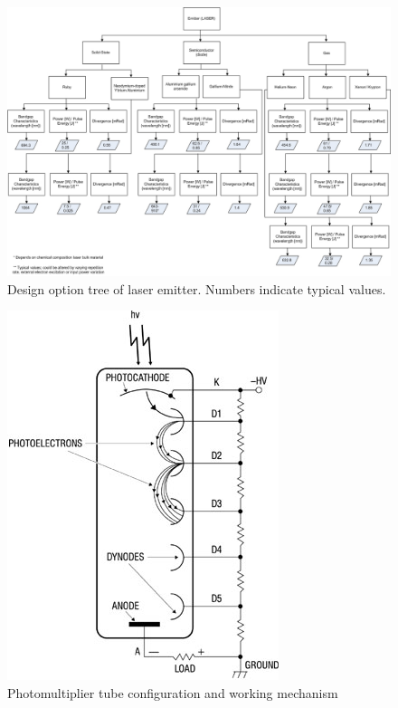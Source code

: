 \begin{figure} [!ht]
	\centering
	\includegraphics[height=0.85\textwidth,angle=90]{chapters/img/DOStree_laser.jpg}	
	\caption{Design option tree of laser emitter. Numbers indicate typical values.}
	\label{DOS_laser}
\end{figure}

\begin{figure} [ht]
\begin{center}
\includegraphics[scale=3]{chapters/img/DO_receiver1.jpg}	
\caption{Photomultiplier tube configuration and working mechanism}
\label{Photomultiplier}
\end{center}
\end{figure}


